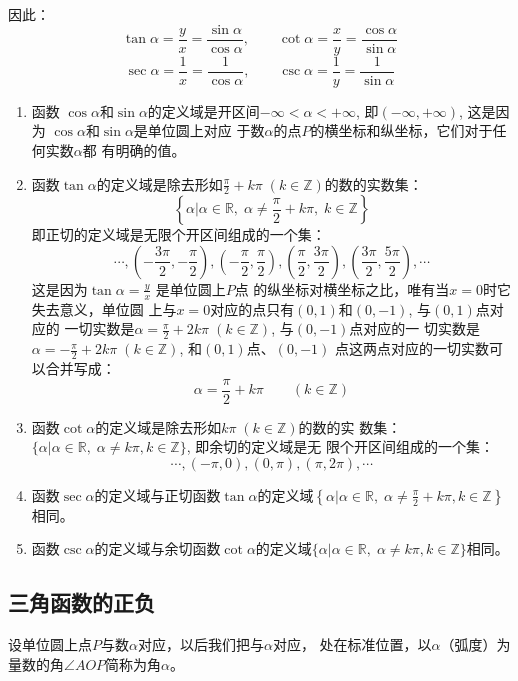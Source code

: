 因此：
\[\tan\alpha=\frac{y}{x}=\frac{\sin\alpha}{\cos\alpha},\qquad \cot\alpha=\frac{x}{y}=\frac{\cos\alpha}{\sin\alpha}\]
\[ \sec\alpha=\frac{1}{x}=\frac{1}{\cos\alpha},\qquad \csc\alpha=\frac{1}{y}=\frac{1}{\sin\alpha}\]

\begin{enumerate}
    \item 函数 $\cos\alpha$和$\sin\alpha$的定义域是开区间$-\infty<\alpha<+\infty$,
    即$(-\infty,+\infty)$, 这是因为 $\cos\alpha$和$\sin\alpha$是单位圆上对应
    于数$\alpha$的点$P$的横坐标和纵坐标，它们对于任何实数$\alpha$都
    有明确的值。
\item 函数$\tan\alpha$的定义域是除去形如$\frac{\pi}{2}+k\pi\; (k\in\mathbb{Z})$的数的实数集：
    \[\left\{\alpha\Big|\alpha\in\mathbb{R},\; \alpha\ne \frac{\pi}{2}+k\pi, \; k\in\mathbb{Z} \right\} \]
    即正切的定义域是无限个开区间组成的一个集：
\[\cdots, \left(-\frac{3\pi}{2},-\frac{\pi}{2}\right), \left(-\frac{\pi}{2},\frac{\pi}{2}\right), \left(\frac{\pi}{2},\frac{3\pi}{2}\right),\left(\frac{3\pi}{2},\frac{5\pi}{2}\right),\cdots\]
这是因为$\tan\alpha =\frac{y}{x}$
是单位圆上$P$点
的纵坐标对横坐标之比，唯有当$x=0$时它失去意义，单位圆
上与$x=0$对应的点只有$(0,1)$和$(0,-1)$, 与$(0,1)$点对应的
一切实数是$\alpha=\frac{\pi}{2}+2k\pi\; (k\in\mathbb{Z})$, 与$(0,-1)$点对应的一
切实数是$\alpha=-\frac{\pi}{2}+2k\pi\; (k\in\mathbb{Z})$, 和$(0,1)$点、$(0,-1)$
点这两点对应的一切实数可以合并写成：
\[\alpha=\frac{\pi}{2}+k\pi\qquad  (k\in\mathbb{Z})\]
\item 函数$\cot\alpha$的定义域是除去形如$k\pi\;  (k\in\mathbb{Z})$的数的实
数集：$\{\alpha|\alpha\in\mathbb{R},\; \alpha\ne k\pi ,k\in\mathbb{Z}\}$, 即余切的定义域是无
限个开区间组成的一个集：
\[\cdots, (-\pi ,0),(0,\pi ),(\pi ,2\pi ),\cdots\]
\item 函数$\sec\alpha$的定义域与正切函数$\tan\alpha$的定义域$\left\{\alpha\Big|\alpha\in\mathbb{R},\;  \alpha\ne \frac{\pi}{2}+k\pi ,k\in\mathbb{Z}\right\}$相同。
\item 函数$\csc\alpha$的定义域与余切函数$\cot\alpha$的定义域$\{\alpha|\alpha\in\mathbb{R},\; \alpha\ne k\pi ,k\in\mathbb{Z}\}$相同。
\end{enumerate}

\subsection{三角函数的正负}
设单位圆上点$P$与数$\alpha$对应，以后我们把与$\alpha$对应，
处在标准位置，以$\alpha$（弧度）为量数的角$\angle AOP$简称为角$\alpha$。

